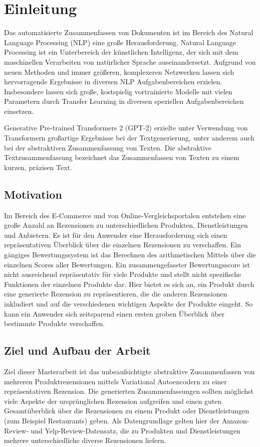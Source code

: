 \section{Einleitung}\raggedbottom
Das automatisierte Zusammenfassen von Dokumenten ist im Bereich des Natural Language Processing (NLP) eine große Herausforderung.
Natural Language Processing ist ein Unterbereich der künstlichen Intelligenz, der sich mit dem maschinellen Verarbeiten von natürlicher Sprache auseinandersetzt. 
Aufgrund von neuen Methoden und immer größeren, komplexeren Netzwerken lassen sich hervorragende Ergebnisse in diversen NLP Aufgabenbereichen erzielen. 
Insbesondere lassen sich große, kostspielig vortrainierte Modelle mit vielen Parametern durch Transfer Learning in diversen speziellen Aufgabenbereichen einsetzen. 

Generative Pre-trained Transformers 2 (GPT-2) erzielte unter Verwendung von Transformern großartige Ergebnisse bei der Textgenerierung, unter anderem auch bei der abstraktiven Zusammenfassung von Texten. 
Die abstraktive Textzusammenfassung bezeichnet das Zusammenfassen von Texten zu einem kurzen, präzisen Text. 

\subsection{Motivation}
Im Bereich des E-Commerce und von Online-Vergleichsportalen entstehen eine große Anzahl an Rezensionen zu unterschiedlichen Produkten, Dienstleistungen und Anbietern.
Es ist für den Anwender eine Herausforderung sich einen repräsentativen Überblick über die einzelnen Rezensionen zu verschaffen. 
Ein gängiges Bewertungssystem ist das Berechnen des arithmetischen Mittels über die einzelnen Scores aller Bewertungen. 
Ein zusammengefasster Bewertungsscore ist nicht ausreichend repräsentativ für viele Produkte und stellt nicht spezifische Funktionen der einzelnen Produkte dar.
Hier bietet es sich an, ein Produkt durch eine generierte Rezension zu repräsentieren, die die anderen Rezensionen inkludiert und auf die verschiedenen wichtigen Aspekte der Produkte eingeht.
So kann ein Anwender sich zeitsparend einen ersten groben Überblick über bestimmte Produkte verschaffen.

\subsection{Ziel und Aufbau der Arbeit}
Ziel dieser Masterarbeit ist das unbeaufsichtigte abstraktive Zusammenfassen von mehreren Produktrezensionen mittels Variational Autoencodern zu einer repräsentativen Rezension.
Die generierten Zusammenfassungen sollten möglichst viele Aspekte der ursprünglichen Rezension aufgreifen und einen guten Gesamtüberblick über die Rezensionen zu einem Produkt oder Dienstleistungen (zum Beispiel Restaurants) geben.
Als Datengrundlage gelten hier der Amazon-Review- und Yelp-Review-Datensatz, die zu Produkten und Dienstleistungen mehrere unterschiedliche diverse Rezensionen liefern.

